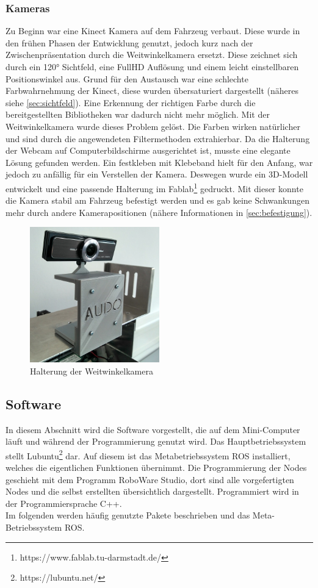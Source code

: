 \subsubsection{Kameras}
\label{sec:kameras}
Zu Beginn war eine Kinect Kamera auf dem Fahrzeug verbaut. Diese wurde in den frühen Phasen der Entwicklung genutzt, jedoch kurz nach der Zwischenpräsentation durch die Weitwinkelkamera ersetzt. Diese zeichnet sich durch ein 120° Sichtfeld, eine FullHD Auflösung und einem leicht einstellbaren Positionswinkel aus.
Grund für den Austausch war eine schlechte Farbwahrnehmung der Kinect, diese wurden übersaturiert dargestellt (näheres siehe \autoref{sec:sichtfeld}). Eine Erkennung der richtigen Farbe durch die bereitgestellten Bibliotheken war dadurch nicht mehr möglich. 
Mit der Weitwinkelkamera wurde dieses Problem gelöst. Die Farben wirken natürlicher und sind durch die angewendeten Filtermethoden extrahierbar. Da die Halterung der Webcam auf Computerbildschirme ausgerichtet ist, musste eine elegante Lösung gefunden werden. Ein festkleben mit Klebeband hielt für den Anfang, war jedoch zu anfällig für ein Verstellen der Kamera.
Deswegen  wurde ein 3D-Modell entwickelt und eine passende Halterung im Fablab\footnote{https://www.fablab.tu-darmstadt.de/} gedruckt. Mit dieser konnte die Kamera stabil am Fahrzeug befestigt werden und es gab keine Schwankungen mehr durch andere Kamerapositionen (nähere Informationen in \autoref{sec:befestigung}). 
\begin{figure}
	\centering
	\includegraphics[width=0.5\textwidth]{images/Foto_Halterung.jpg}
	\caption{Halterung der Weitwinkelkamera}
	\label{abb:halterung}
\end{figure}
\subsection{Software}
\label{sec:software}
In diesem Abschnitt wird die Software vorgestellt, die auf dem Mini-Computer läuft und während der Programmierung genutzt wird. Das Hauptbetriebssystem stellt Lubuntu\footnote{https://lubuntu.net/} dar. Auf diesem ist das Metabetriebssystem ROS installiert, welches die eigentlichen Funktionen übernimmt. Die Programmierung der Nodes geschieht mit dem Programm RoboWare Studio, dort sind alle vorgefertigten Nodes und die selbst erstellten  übersichtlich dargestellt. Programmiert wird in der Programmiersprache C++. \\
Im folgenden werden häufig genutzte Pakete beschrieben und das Meta-Betriebssystem ROS.

